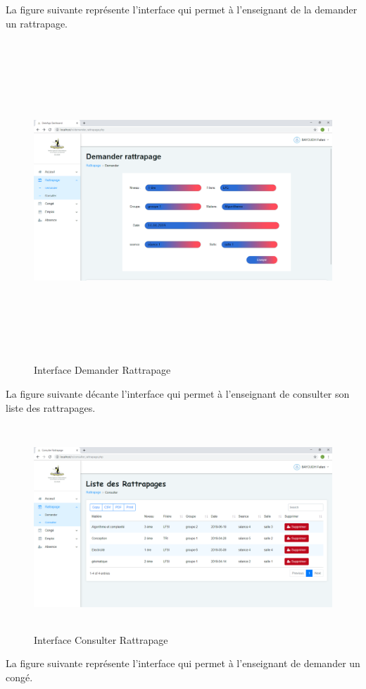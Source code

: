 \documentclass[12 pt ]{report}
\begin{document}
La figure suivante représente l'interface qui permet à l'enseignant de la demander un rattrapage.

\begin{figure}[h]
 \begin{center}
\includegraphics[width= 18 cm ,height=  12cm]{demander_rattrapage.PNG}
\caption{Interface Demander Rattrapage}

\end{center}
\end{figure}
\newpage
La figure suivante décante l'interface qui permet à l'enseignant de consulter son liste des  rattrapages.

\begin{figure}[h]
 \begin{center}
\includegraphics[width= 15 cm ,height=  7.7cm]{consulter_rattrapage.PNG}
\caption{Interface Consulter Rattrapage}

\end{center}
\end{figure}
La figure suivante représente l'interface qui permet à l'enseignant de  demander un congé.
\end{document}
